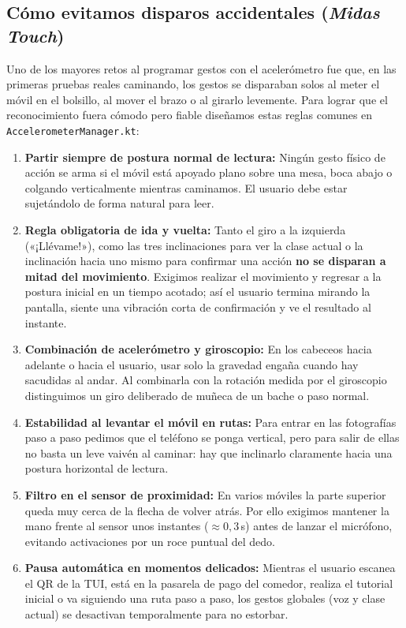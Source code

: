 \documentclass[11pt,a4paper]{article}
\begin{document}
\subsection{Cómo evitamos disparos accidentales (\textit{Midas Touch})}
Uno de los mayores retos al programar gestos con el acelerómetro fue que, en las primeras pruebas reales caminando, los gestos se disparaban solos al meter el móvil en el bolsillo, al mover el brazo o al girarlo levemente. Para lograr que el reconocimiento fuera cómodo pero fiable diseñamos estas reglas comunes en \texttt{AccelerometerManager.kt}:

\begin{enumerate}[leftmargin=1.8em]
    \item \textbf{Partir siempre de postura normal de lectura:} Ningún gesto físico de acción se arma si el móvil está apoyado plano sobre una mesa, boca abajo o colgando verticalmente mientras caminamos. El usuario debe estar sujetándolo de forma natural para leer.
    \item \textbf{Regla obligatoria de ida y vuelta:} Tanto el giro a la izquierda («¡Llévame!»), como las tres inclinaciones para ver la clase actual o la inclinación hacia uno mismo para confirmar una acción \textbf{no se disparan a mitad del movimiento}. Exigimos realizar el movimiento y regresar a la postura inicial en un tiempo acotado; así el usuario termina mirando la pantalla, siente una vibración corta de confirmación y ve el resultado al instante.
    \item \textbf{Combinación de acelerómetro y giroscopio:} En los cabeceos hacia adelante o hacia el usuario, usar solo la gravedad engaña cuando hay sacudidas al andar. Al combinarla con la rotación medida por el giroscopio distinguimos un giro deliberado de muñeca de un bache o paso normal.
    \item \textbf{Estabilidad al levantar el móvil en rutas:} Para entrar en las fotografías paso a paso pedimos que el teléfono se ponga vertical, pero para salir de ellas no basta un leve vaivén al caminar: hay que inclinarlo claramente hacia una postura horizontal de lectura.
    \item \textbf{Filtro en el sensor de proximidad:} En varios móviles la parte superior queda muy cerca de la flecha de volver atrás. Por ello exigimos mantener la mano frente al sensor unos instantes ($\approx 0{,}3$\,s) antes de lanzar el micrófono, evitando activaciones por un roce puntual del dedo.
    \item \textbf{Pausa automática en momentos delicados:} Mientras el usuario escanea el QR de la TUI, está en la pasarela de pago del comedor, realiza el tutorial inicial o va siguiendo una ruta paso a paso, los gestos globales (voz y clase actual) se desactivan temporalmente para no estorbar.
\end{enumerate}
\end{document}
